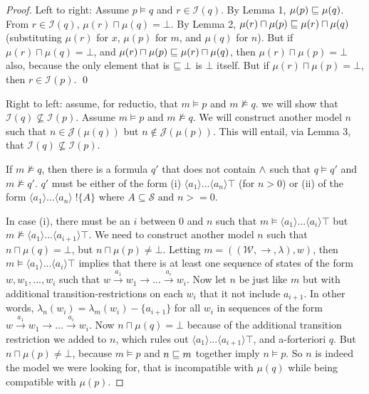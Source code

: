 \begin{proof}

Left to right: Assume $p \models q$ and $r \in \mathcal{I}(q)$.
By Lemma 1, $\mu(p) \sqsubseteq \mu(q)$.
From $r \in \mathcal{I}(q)$, $\mu(r) \sqcap \mu(q) = \bot$.
By Lemma 2, $\mu(r) \sqcap \mu(p) \sqsubseteq \mu(r) \sqcap \mu(q)$ (substituting $\mu(r)$ for $x$, $\mu(p)$ for $m$, and $\mu(q)$ for $n$).
But if $\mu(r) \sqcap \mu(q) = \bot$, and $\mu(r) \sqcap \mu(p) \sqsubseteq \mu(r) \sqcap \mu(q)$, then $\mu(r) \sqcap \mu(p) = \bot$ also, because the only element that is $\sqsubseteq \bot$ is $\bot$ itself.
But if $\mu(r) \sqcap \mu(p) = \bot$, then $r \in \mathcal{I}(p)$.
\qed

Right to left: assume, for reductio, that $m \models p$ and $m \nvDash q$. we will show that $\mathcal{I}(q) \nsubseteq \mathcal{I}(p)$. 
Assume $m \models p \mbox{ and } m \nvDash q$. We will construct another model $n$ such that $n \in \mathcal{J}(\mu(q))$ but $n \notin \mathcal{J}(\mu(p))$.
This will entail, via Lemma 3, that $\mathcal{I}(q) \nsubseteq \mathcal{I}(p)$.

If $m \nvDash q$, then there is a formula $q'$ that does not contain $\land$ such that $q \models q'$ and $m \nvDash q'$. $q'$ must be either of the form (i) $\langle a_1 \rangle ... \langle a_n \rangle \top$ (for $n > 0$) or (ii) of the form $\langle a_1 \rangle ... \langle a_n \rangle \; !\{A\}$ where $A \subseteq \mathcal{S} \mbox{ and } n >= 0$.

In case (i), there must be an $i$ between $0$ and $n$ such that $m \models \langle a_1 \rangle ... \langle a_i \rangle \top$ but $m \nvDash  \langle a_1 \rangle ... \langle a_{i+1} \rangle \top$. We need to construct another model $n$ such that $n \sqcap \mu(q) = \bot$, but $n \sqcap \mu(p) \neq \bot$. Letting $m = ((\mathcal{W},\rightarrow,\lambda),w)$, then $m \models \langle a_1 \rangle ... \langle a_i \rangle \top$ implies that there is at least one sequence of states of the form $w, w_1, ..., w_i$ such that $w \xrightarrow{a_1} w_1 \rightarrow ... \xrightarrow{a_i} w_i$. 
Now let $n$ be just like $m$ but with additional transition-restrictions on each $w_i$ that it not include $a_{i+1}$. 
In other words, $\lambda_n(w_i) = \lambda_m(w_i)  - \{a_{i+1}\}$ for all $w_i$ in sequences of the form $w \xrightarrow{a_1} w_1 \rightarrow ... \xrightarrow{a_i} w_i$. Now $n \sqcap \mu(q) = \bot$ because of the additional transition restriction we added to $n$, which rules out $\langle a_1 \rangle ... \langle a_{i+1} \rangle \top$, and a-forteriori $q$. But $n \sqcap \mu(p) \neq \bot$, because $m \models p$ and $n \sqsubseteq m$ together imply $n \models p$. So $n$ is indeed the model we were looking for, that is incompatible with $\mu(q)$ while being compatible with $\mu(p)$.


\end{proof}
